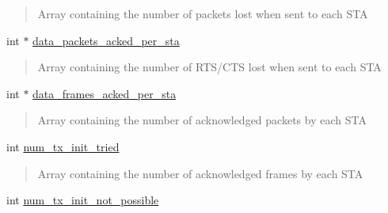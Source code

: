 \begin{DoxyCompactItemize}
\begin{DoxyCompactList}\small\item\em \begin{quote}
Array containing the number of packets lost when sent to each S\+TA \end{quote}
\end{DoxyCompactList}\item 
\mbox{\label{structPerformance_a1e1dcc708327d9203646a3f345e0c087}} 
int $\ast$ \hyperlink{structPerformance_a1e1dcc708327d9203646a3f345e0c087}{data\+\_\+packets\+\_\+acked\+\_\+per\+\_\+sta}
\begin{DoxyCompactList}\small\item\em \begin{quote}
Array containing the number of R\+T\+S/\+C\+TS lost when sent to each S\+TA \end{quote}
\end{DoxyCompactList}\item 
\mbox{\label{structPerformance_a66f1a941381d0af31acfdd04adc8268f}} 
int $\ast$ \hyperlink{structPerformance_a66f1a941381d0af31acfdd04adc8268f}{data\+\_\+frames\+\_\+acked\+\_\+per\+\_\+sta}
\begin{DoxyCompactList}\small\item\em \begin{quote}
Array containing the number of acknowledged packets by each S\+TA \end{quote}
\end{DoxyCompactList}\item 
\mbox{\label{structPerformance_a75c2f3d7375600e81bafbf89410ab046}} 
int \hyperlink{structPerformance_a75c2f3d7375600e81bafbf89410ab046}{num\+\_\+tx\+\_\+init\+\_\+tried}
\begin{DoxyCompactList}\small\item\em \begin{quote}
Array containing the number of acknowledged frames by each S\+TA \end{quote}
\end{DoxyCompactList}\item 
\mbox{\label{structPerformance_a035360f620233fd80e0e3962244fb336}} 
int \hyperlink{structPerformance_a035360f620233fd80e0e3962244fb336}{num\+\_\+tx\+\_\+init\+\_\+not\+\_\+possible}
\begin{DoxyCompactList}\small\item\em \begin{quote}

\end{quote}
\end{DoxyCompactList}
\end{DoxyCompactItemize}
